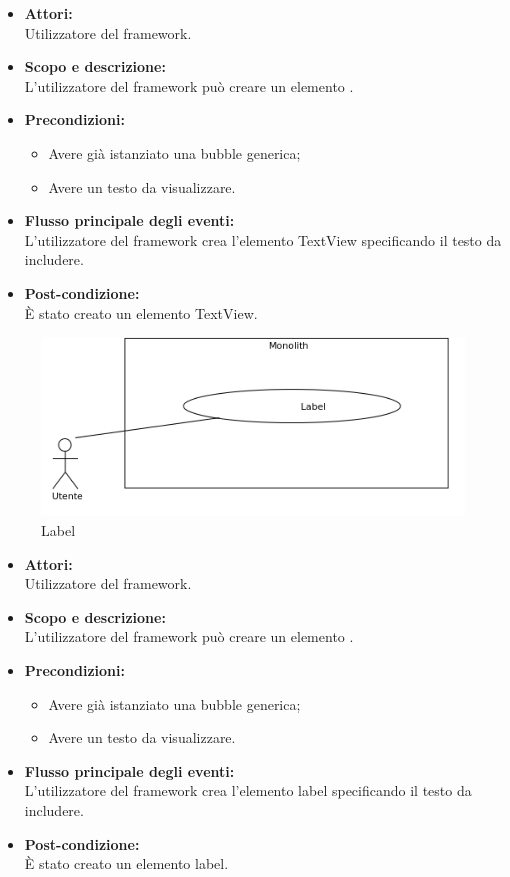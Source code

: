 \begin{itemize}
	\item \textbf{Attori:}
	\\Utilizzatore del framework.
	\item \textbf{Scopo e descrizione:} 
	\\L'utilizzatore del framework può creare un elemento .
	\item \textbf{Precondizioni:}
	\begin{itemize}
		\item Avere già istanziato una bubble generica;
		\item Avere un testo da visualizzare.
	\end{itemize}
	\item \textbf{Flusso principale degli eventi:}
	\\L'utilizzatore del framework crea l'elemento TextView specificando il testo da includere.
	\item \textbf{Post-condizione:}
	\\È stato creato un elemento TextView.
\end{itemize}

\pagebreak


\begin{figure}[H]
	\centering
	\includegraphics[width=15cm]{../../documenti/AnalisiDeiRequisiti/Diagrammi_img/uc1_27.png}
	\caption{\UCFFCaption{} Label}
\end{figure}

\begin{itemize}
	\item \textbf{Attori:}
	\\Utilizzatore del framework.
	\item \textbf{Scopo e descrizione:} 
	\\L'utilizzatore del framework può creare un elemento .
	\item \textbf{Precondizioni:}
	\begin{itemize}
		\item Avere già istanziato una bubble generica;
		\item Avere un testo da visualizzare.
	\end{itemize}
	\item \textbf{Flusso principale degli eventi:}
	\\L'utilizzatore del framework crea l'elemento label specificando il testo da includere.
	\item \textbf{Post-condizione:}
	\\È stato creato un elemento label.
\end{itemize}

